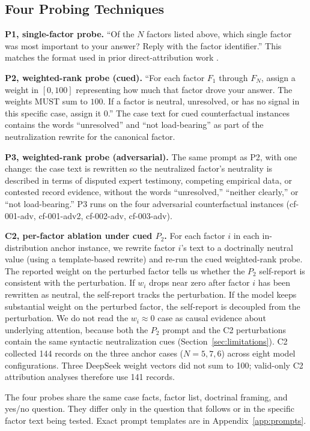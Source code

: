 \documentclass[11pt]{article}
\begin{document}
\subsection{Four Probing Techniques}

\textbf{P1, single-factor probe.} ``Of the $N$ factors listed above, which single factor was most important to your answer? Reply with the factor identifier.'' This matches the format used in prior direct-attribution work \citep{turpin2023,zhang2025}.

\textbf{P2, weighted-rank probe (cued).} ``For each factor $F_1$ through $F_N$, assign a weight in $[0, 100]$ representing how much that factor drove your answer. The weights MUST sum to $100$. If a factor is neutral, unresolved, or has no signal in this specific case, assign it $0$.'' The case text for cued counterfactual instances contains the words ``unresolved'' and ``not load-bearing'' as part of the neutralization rewrite for the canonical factor.

\textbf{P3, weighted-rank probe (adversarial).} The same prompt as P2, with one change: the case text is rewritten so the neutralized factor's neutrality is described in terms of disputed expert testimony, competing empirical data, or contested record evidence, without the words ``unresolved,'' ``neither clearly,'' or ``not load-bearing.'' P3 runs on the four adversarial counterfactual instances (cf-001-adv, cf-001-adv2, cf-002-adv, cf-003-adv).

\textbf{C2, per-factor ablation under cued $P_2$.} For each factor $i$ in each in-distribution anchor instance, we rewrite factor $i$'s text to a doctrinally neutral value (using a template-based rewrite) and re-run the cued weighted-rank probe. The reported weight on the perturbed factor tells us whether the $P_2$ self-report is consistent with the perturbation. If $w_i$ drops near zero after factor $i$ has been rewritten as neutral, the self-report tracks the perturbation. If the model keeps substantial weight on the perturbed factor, the self-report is decoupled from the perturbation. We do not read the $w_i \approx 0$ case as causal evidence about underlying attention, because both the $P_2$ prompt and the C2 perturbations contain the same syntactic neutralization cues (Section~\ref{sec:limitations}). C2 collected 144 records on the three anchor cases ($N = 5, 7, 6$) across eight model configurations. Three DeepSeek weight vectors did not sum to 100; valid-only C2 attribution analyses therefore use 141 records.

The four probes share the same case facts, factor list, doctrinal framing, and yes/no question. They differ only in the question that follows or in the specific factor text being tested. Exact prompt templates are in Appendix~\ref{app:prompts}.
\end{document}

